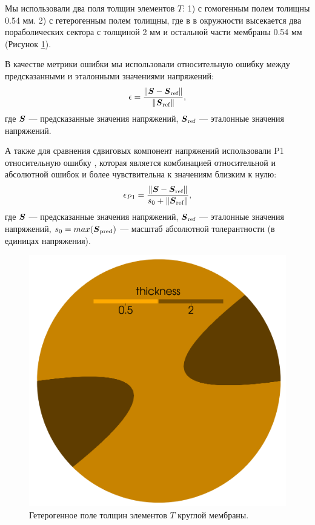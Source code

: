   Мы использовали два поля толщин элементов $T$: 1) с гомогенным полем толищны 0.54 мм. 
  2) с гетерогенным полем толищны, где в в окружности высекается два пораболических сектора с толщиной 2 мм
  и остальной части мембраны 0.54 мм (Рисунок \ref{fig:membrane_thickness}). 

  В качестве метрики ошибки мы использовали относительную ошибку между предсказанными и эталонными значениями напряжений:
  \begin{equation}
    \epsilon = \frac{\| \boldsymbol{S} - \boldsymbol{S}_{\text{ref}} \|}{\| \boldsymbol{S}_{\text{ref}} \|},
  \end{equation}
  где $\boldsymbol{S}$ — предсказанные значения напряжений, $\boldsymbol{S}_{\text{ref}}$ — эталонные значения напряжений.

  А также для сравнения сдвиговых компонент напряжений использовали P1 относительную ошибку \cite{xie2024p1}, которая является комбинацией относительной и абсолютной ошибок и 
  более чувствительна к значениям близким к нулю:
  \begin{equation}
    \epsilon_{P1} = \frac{\| \boldsymbol{S} - \boldsymbol{S}_{\text{ref}} \|}{s_0 + \| \boldsymbol{S}_{\text{ref}} \|},
  \end{equation}
  где $\boldsymbol{S}$ — предсказанные значения напряжений, $\boldsymbol{S}_{\text{ref}}$ — эталонные значения напряжений, $s_0 = max(\boldsymbol{S}_{\text{pred}})$ — масштаб абсолютной толерантности (в единицах напряжения).

  \begin{figure}[H]
    \centering
    \includegraphics[width=0.25\linewidth]{img/het_circle.png}
    \caption{Гетерогенное поле толщин элементов $T$ круглой мембраны.}
    \label{fig:membrane_thickness}
  \end{figure}

